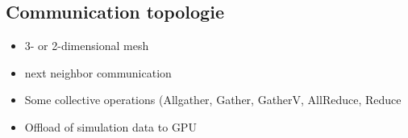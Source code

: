 \subsection{Communication topologie}
\begin{itemize}
\item 3- or 2-dimensional mesh
\item next neighbor communication
\item Some collective operations (Allgather, Gather, GatherV, AllReduce, Reduce
\item Offload of simulation data to GPU
\end{itemize}


\cleardoublepage

